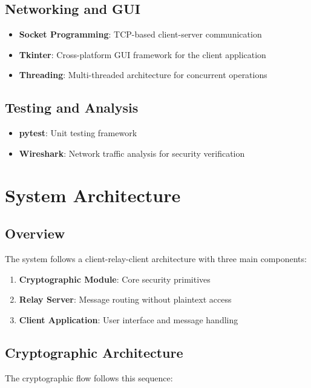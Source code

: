 \documentclass[12pt,a4paper]{article}
\begin{document}
\subsection{Networking and GUI}
\begin{itemize}
    \item \textbf{Socket Programming}: TCP-based client-server communication
    \item \textbf{Tkinter}: Cross-platform GUI framework for the client application
    \item \textbf{Threading}: Multi-threaded architecture for concurrent operations
\end{itemize}

\subsection{Testing and Analysis}
\begin{itemize}
    \item \textbf{pytest}: Unit testing framework
    \item \textbf{Wireshark}: Network traffic analysis for security verification
\end{itemize}

\section{System Architecture}

\subsection{Overview}

The system follows a client-relay-client architecture with three main components:

\begin{enumerate}
    \item \textbf{Cryptographic Module}: Core security primitives
    \item \textbf{Relay Server}: Message routing without plaintext access
    \item \textbf{Client Application}: User interface and message handling
\end{enumerate}

\subsection{Cryptographic Architecture}

The cryptographic flow follows this sequence:
\end{document}
